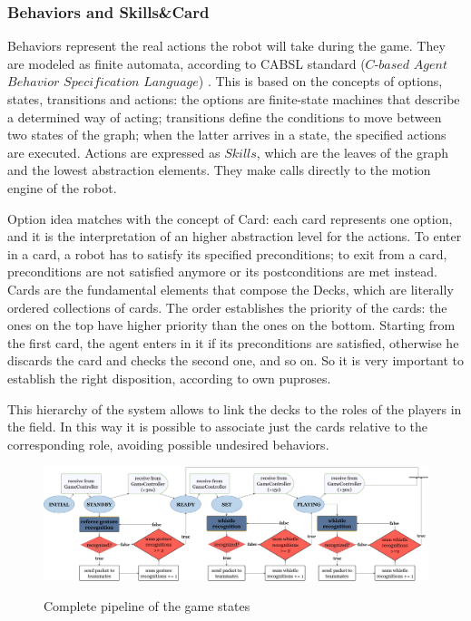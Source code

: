 \documentclass[a4paper, onecolumn, 12pt]{article}
\begin{document}
\subsubsection{Behaviors and Skills\&Card}
Behaviors represent the real actions the robot will take during the game. They are modeled as finite 
automata, according to CABSL standard ($C$-$based$ $Agent$ $Behavior$ $Specification$ $Language$) \cite{}.
This is based on the concepts of options, states, transitions and actions: the options are finite-state machines that
describe a determined way of acting; transitions define the conditions to move between two states of the graph; 
when the latter arrives in a state, the specified actions are executed.
Actions are expressed as $Skills$, which are the leaves of the graph and the lowest abstraction elements.
They make calls directly to the motion engine of the robot.

Option idea matches with the concept of Card: each card represents one option, and it is the interpretation
of an higher abstraction level for the actions. 
To enter in a card, a robot has to satisfy its specified preconditions; to exit from a card, preconditions are not
satisfied anymore or its postconditions are met instead.
Cards are the fundamental elements that compose the Decks, which are literally ordered collections of cards.
The order establishes the priority of the cards: the ones on the top have higher priority than the ones on the bottom.
Starting from the first card, the agent enters in it if its preconditions are satisfied, otherwise he discards 
the card and checks the second one, and so on. So it is very important to establish the right disposition,
according to own puproses. 

This hierarchy of the system allows to link the decks to the roles of the players in the field. 
In this way it is possible to associate just the cards relative to the corresponding role, avoiding
possible undesired behaviors. 


\begin{figure}
    \centering
    \includegraphics[width=0.9\linewidth]{assets/flowchart.png}
    \label{fig:flowchart}
    \caption{Complete pipeline of the game states}
\end{figure}
\end{document}
